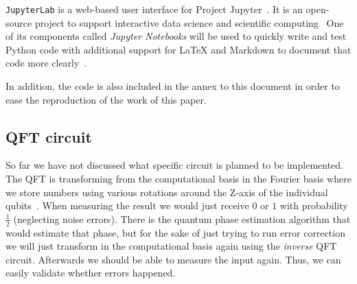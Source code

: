 \texttt{JupyterLab} is a web-based user interface for Project Jupyter~\cite{JupyterLabDocs}.
It is an open-source project to support interactive data science and scientific computing~\cite{ProjectJupyter}
One of its components called \emph{Jupyter Notebooks} will be used to quickly write and test Python code with additional support for LaTeX and Markdown to document that code more clearly~\cite{JupyterLabOverview}.

In addition, the code is also included in the annex to this document in order to ease the reproduction of the work of this paper.

\subsection{QFT circuit}
\label{subsec:qft-circuit}

So far we have not discussed what specific circuit is planned to be implemented.
The QFT is transforming from the computational basis in the Fourier basis where we store numbers using various rotations around the Z-axis of the individual qubits~\cite{QiskitTBQFT}.
When measuring the result we would just receive \(0\) or \(1\) with probability \(\frac{1}{2}\) (neglecting noise errors).
There is the quantum phase estimation algorithm that would estimate that phase, but for the sake of just trying to run error correction we will just transform in the computational basis again using the \emph{inverse} QFT circuit.
Afterwards we should be able to measure the input again.
Thus, we can easily validate whether errors happened.
